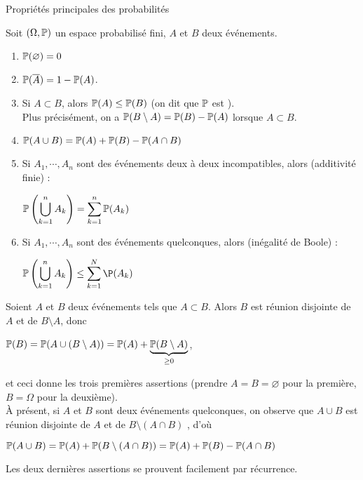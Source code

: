 \documentclass[12pt,a4paper]{report}
\begin{document}
\begin{proposition}{Propriétés principales des probabilités}{}

Soit $(\Omega,\mathbb{P})$ un espace probabilisé fini, $A$ et $B$ deux événements.
\begin{enumerate}
	\item $\mathbb{P}(\varnothing) = 0$
	\item $\mathbb{P}(\overline{A}) = 1- \mathbb{P}(A)$.
	\item Si $A \subset B$, alors $\mathbb{P}(A) \le \mathbb{P}(B)$ (on dit que $\mathbb{P}$ est ). \\
	Plus précisément, on a $\mathbb{P}(B \setminus A) = \mathbb{P}(B) - \mathbb{P}(A)$ lorsque $A \subset B$.
	\item $\mathbb{P}(A \cup B) = \mathbb{P}(A) + \mathbb{P}(B) - \mathbb{P}(A \cap B)$
	\item Si $A_1,\cdots,A_n$ sont des événements deux à deux incompatibles, alors (additivité finie) :
	\begin{center}
	$\displaystyle \mathbb{P} \left(\bigcup_{k=1}^n A_k\right) = \sum_{k=1}^n \mathbb{P}(A_k)$
	\end{center}
	
	\item Si $A_1,\cdots,A_n$ sont des événements quelconques, alors (inégalité de Boole) :
	\begin{center}
	$\displaystyle \p\left(\bigcup_{k=1}^n A_k\right) \le \sum_{k=1}^N \P(A_k)$
	\end{center}
\end{enumerate}

\end{proposition}

\begin{demo}{}
Soient $A$ et $B$ deux événements tels que $A \subset B$. Alors $B$ est réunion disjointe de $A$ et de $B \setminus A$, donc 
\begin{center}
$\mathbb{P}(B) = \mathbb{P}(A \cup (B \setminus A)) = \mathbb{P}(A)+\underbrace{\mathbb{P}(B \setminus A)}_{\ge 0}$,
\end{center}

et ceci donne les trois premières assertions (prendre $A = B = \varnothing$ pour la première, $B = \Omega$ pour la deuxième). \\
À présent, si $A$ et $B$ sont deux événements quelconques, on observe que $A \cup B$ est réunion disjointe de $A$ et de $B \setminus (A \cap B)$ \footnotemark, d'où
\begin{center}
$\mathbb{P}(A \cup B) = \mathbb{P}(A) + \mathbb{P}(B \setminus (A \cap B)) = \mathbb{P}(A) + \mathbb{P}(B) - \mathbb{P}(A \cap B)$
\end{center}

Les deux dernières assertions se prouvent facilement par récurrence.
\end{demo}
\end{document}
